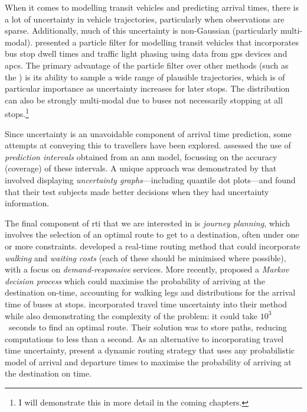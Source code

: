 When it comes to modelling transit vehicles and predicting arrival times, there is a lot of uncertainty in vehicle trajectories, particularly when observations are sparse. Additionally, much of this uncertainty is non-Gaussian (particularly multi-modal).  presented a particle filter for modelling transit vehicles that incorporates bus stop dwell times and traffic light phasing using data from \gls{gps} devices and \glspl{apc}. The primary advantage of the particle filter over other methods (such as the \kf{}) is its ability to sample a wide range of plausible trajectories, which is of particular importance as uncertainty increases for later stops. The distribution can also be strongly multi-modal due to buses not necessarily stopping at all stops.\footnote{I will demonstrate this in more detail in the coming chapters.}


Since uncertainty is an unavoidable component of arrival time prediction, some attempts at conveying this to travellers have been explored.  assessed the use of \emph{prediction intervals} obtained from an \gls{ann} model, focussing on the accuracy (coverage) of these intervals. A unique approach was demonstrated by \citet{Fernandes_2018} that involved displaying \emph{uncertainty graphs}---including quantile dot plots---and found that their test subjects made better decisions when they had uncertainty information.


The final component of \gls{rti} that we are interested in is \emph{journey planning}, which involves the selection of an optimal route to get to a destination, often under one or more constraints.  developed a real-time routing method that could incorporate \emph{walking} and \emph{waiting costs} (each of these should be minimised where possible), with a focus on \emph{demand-responsive} services. More recently, \citet{Hame_2013a,Hame_2013b} proposed a \emph{Markov decision process} which could maximise the probability of arriving at the destination on-time, accounting for walking legs and distributions for the arrival time of buses at stops.  \citet{Zheng_2016} incorporated travel time uncertainty into their method while also demonstrating the complexity of the problem:  it could take $10^3$~seconds to find an optimal route. Their solution was to store paths, reducing computations to less than a second. As an alternative to incorporating travel time uncertainty, \citet{Berczi_2017} present a dynamic routing strategy that uses any probabilistic model of arrival and departure times to maximise the probability of arriving at the destination on time.


